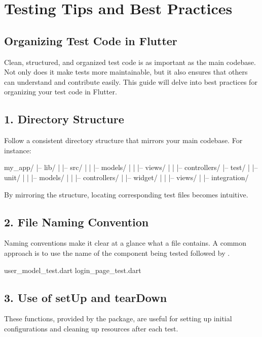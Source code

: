 \section{Testing Tips and Best Practices}
\subsection{Organizing Test Code in Flutter}

Clean, structured, and organized test code is as important as the main codebase. Not only does it make tests more maintainable, but it also ensures that others can understand and contribute easily. This guide will delve into best practices for organizing your test code in Flutter.

\subsection*{1. Directory Structure}

Follow a consistent directory structure that mirrors your main codebase. For instance:

\begin{yamlcode}
my_app/
 |-- lib/
 |   |-- src/
 |   |   |-- models/
 |   |   |-- views/
 |   |   |-- controllers/
 |-- test/
 |   |-- unit/
 |   |   |-- models/
 |   |   |-- controllers/
 |   |-- widget/
 |   |   |-- views/
 |   |-- integration/
\end{yamlcode}

By mirroring the structure, locating corresponding test files becomes intuitive.

\subsection*{2. File Naming Convention}

Naming conventions make it clear at a glance what a file contains. A common approach is to use the name of the component being tested followed by .

\begin{yamlcode}
user_model_test.dart
login_page_test.dart
\end{yamlcode}

\subsection*{3. Use of setUp and tearDown}

These functions, provided by the  package, are useful for setting up initial configurations and cleaning up resources after each test.

